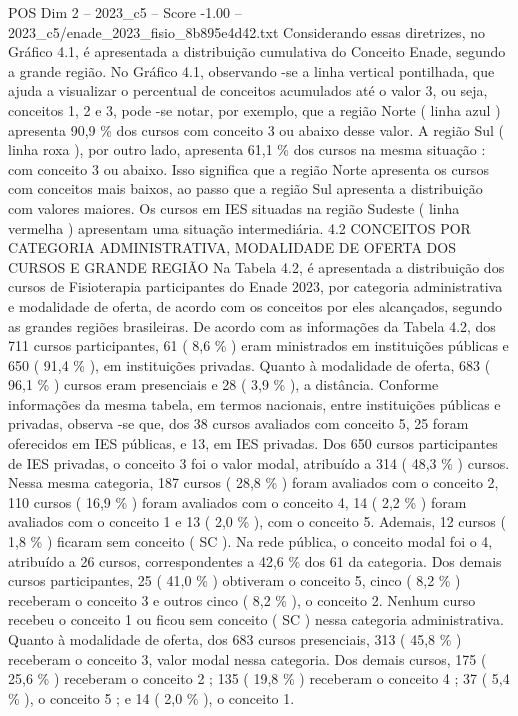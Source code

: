 \begin{textsample}{POS Dim 2 – 2023\_c5 – Score -1.00 – 2023\_c5/enade\_2023\_fisio\_8b895e4d42.txt}
Considerando essas diretrizes, no Gráfico 4.1, é apresentada a distribuição cumulativa do Conceito Enade, segundo a grande região.
No Gráfico 4.1, observando -se a linha vertical pontilhada, que ajuda a visualizar o percentual de conceitos acumulados até o valor 3, ou seja, conceitos 1, 2 e 3, pode -se notar, por exemplo, que a região Norte ( linha azul ) apresenta 90,9 \% dos cursos com conceito 3 ou abaixo desse valor.
A região Sul ( linha roxa ), por outro lado, apresenta 61,1 \% dos cursos na mesma situação : com conceito 3 ou abaixo.
Isso significa que a região Norte apresenta os cursos com conceitos mais baixos, ao passo que a região Sul apresenta a distribuição com valores maiores.
Os cursos em IES situadas na região Sudeste ( linha vermelha ) apresentam uma situação intermediária. 4.2 CONCEITOS POR CATEGORIA ADMINISTRATIVA, MODALIDADE DE OFERTA DOS CURSOS E GRANDE REGIÃO Na Tabela 4.2, é apresentada a distribuição dos cursos de Fisioterapia participantes do Enade 2023, por categoria administrativa e modalidade de oferta, de acordo com os conceitos por eles alcançados, segundo as grandes regiões brasileiras.
De acordo com as informações da Tabela 4.2, dos 711 cursos participantes, 61 ( 8,6 \% ) eram ministrados em instituições públicas e 650 ( 91,4 \% ), em instituições privadas.
Quanto à modalidade de oferta, 683 ( 96,1 \% ) cursos eram presenciais e 28 ( 3,9 \% ), a distância.
Conforme informações da mesma tabela, em termos nacionais, entre instituições públicas e privadas, observa -se que, dos 38 cursos avaliados com conceito 5, 25 foram oferecidos em IES públicas, e 13, em IES privadas.
Dos 650 cursos participantes de IES privadas, o conceito 3 foi o valor modal, atribuído a 314 ( 48,3 \% ) cursos.
Nessa mesma categoria, 187 cursos ( 28,8 \% ) foram avaliados com o conceito 2, 110 cursos ( 16,9 \% ) foram avaliados com o conceito 4, 14 ( 2,2 \% ) foram avaliados com o conceito 1 e 13 ( 2,0 \% ), com o conceito 5.
Ademais, 12 cursos ( 1,8 \% ) ficaram sem conceito ( SC ).
Na rede pública, o conceito modal foi o 4, atribuído a 26 cursos, correspondentes a 42,6 \% dos 61 da categoria.
Dos demais cursos participantes, 25 ( 41,0 \% ) obtiveram o conceito 5, cinco ( 8,2 \% ) receberam o conceito 3 e outros cinco ( 8,2 \% ), o conceito 2.
Nenhum curso recebeu o conceito 1 ou ficou sem conceito ( SC ) nessa categoria administrativa.
Quanto à modalidade de oferta, dos 683 cursos presenciais, 313 ( 45,8 \% ) receberam o conceito 3, valor modal nessa categoria.
Dos demais cursos, 175 ( 25,6 \% ) receberam o conceito 2 ; 135 ( 19,8 \% ) receberam o conceito 4 ; 37 ( 5,4 \% ), o conceito 5 ; e 14 ( 2,0 \% ), o conceito 1.

\end{textsample}
